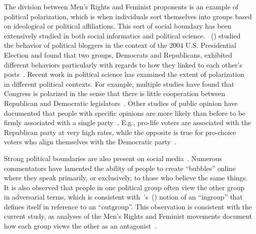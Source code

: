 \documentclass[letterpaper]{article}
\newcommand{\fabio}[1]{{\textcolor{blue}{fabio: #1}}}
\begin{document}
The division between Men's Rights and Feminist proponents is an example of political polarization, which is when individuals sort themselves into groups based on ideological or political affiliations. This sort of social boundary has been extensively studied in both social informatics and political science. \citeauthor{adamic2004divided}~(\citeyear{adamic2004divided}) studied the behavior of political bloggers in the context of the 2004 U.S. Presidential Election and found that two groups, Democrats and Republicans, exhibited different behaviors particularly with regards to how they linked to each other's posts~\cite{adamic2004divided}. 
Recent work in political science has examined the extent of polarization in different political contexts. For example, multiple studies have found that Congress is polarized in the sense that there is little cooperation between Republican and Democratic legislators~\cite{andris2015riseofpartisanship}. Other studies of public opinion have documented that people with specific opinions are more likely than before to be firmly associated with a single party~\cite{gould2015partyaffilpoliticalbelief}. E.g., pro-life voters are associated with the Republican party at very high rates, while the opposite is true for pro-choice voters who align themselves with the Democratic party~\cite{killian2008abortion}.


Strong political boundaries are also present on social media~\cite{connover2011politicalpoltwitter}. Numerous commentators have lamented the ability of people to create ``bubbles'' online where they speak primarily, or exclusively, to those who believe the same things. It is also observed that people in one political group often view the other group in adversarial terms, which is consistent with~\citeauthor{allport1979natureofprejudice}'s~(\citeyear{allport1979natureofprejudice}) notion of an ``ingroup'' that defines itself in reference to an ``outgroup''. This observation is consistent with the current study, as analyses of the Men's Rights and Feminist movements document how each group views the other as an antagonist~\cite{messner2000politicsofmasculinities,menzies2007backlash}. 
\end{document}
